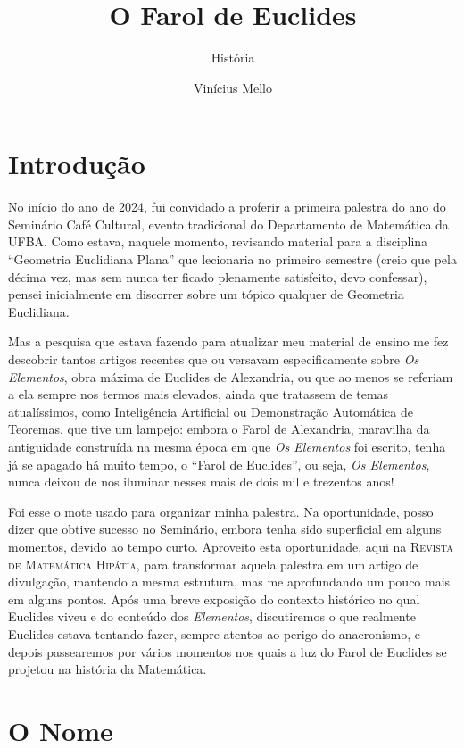 \documentclass{hipatia}
\title{O Farol de Euclides}
\subtitle{História}
\author{Vinícius Mello}
\begin{document}
\setcounter{page}{\historiapage}
\maketitle

\section{Introdução}

No início do ano de 2024, fui convidado a proferir
a primeira palestra do ano do Seminário Café
Cultural, evento tradicional do Departamento de
Matemática da UFBA. Como estava, naquele momento,
revisando material para a disciplina ``Geometria
Euclidiana Plana'' que lecionaria no primeiro
semestre (creio que pela décima vez, mas sem nunca
ter ficado plenamente satisfeito, devo confessar),
pensei inicialmente em discorrer sobre um tópico
qualquer de Geometria Euclidiana.

Mas a pesquisa que estava fazendo para atualizar
meu material de ensino me fez descobrir tantos
artigos recentes que ou versavam especificamente
sobre \emph{Os Elementos},  obra máxima de Euclides
de Alexandria, ou que ao menos se referiam a ela
sempre  nos termos mais elevados, ainda que
tratassem de temas atualíssimos, como Inteligência
Artificial ou Demonstração Automática de Teoremas,
que tive um lampejo: embora o Farol de Alexandria,
maravilha da antiguidade construída na mesma época
em que \emph{Os Elementos} foi escrito, tenha já se
apagado há muito tempo, o ``Farol de Euclides'',
ou seja, \emph{Os Elementos}, nunca deixou de nos
iluminar nesses mais de dois mil e trezentos anos! 

Foi esse o mote usado para organizar minha
palestra. Na oportunidade, posso dizer que obtive
sucesso no Seminário, embora tenha sido
superficial em alguns momentos, devido ao tempo
curto. Aproveito esta oportunidade, aqui na
\textsc{Revista de Matemática Hipátia}, para
transformar aquela palestra em um artigo de
divulgação, mantendo a mesma estrutura, mas me
aprofundando um pouco mais em alguns pontos. Após
uma breve exposição do contexto histórico no qual
Euclides viveu e do conteúdo dos \emph{Elementos},
discutiremos o que realmente Euclides estava
tentando fazer, sempre atentos ao perigo do
anacronismo, e depois passearemos por vários
momentos nos quais a luz do Farol de Euclides se
projetou na história da Matemática.  


\section{O Nome}
\end{document}
